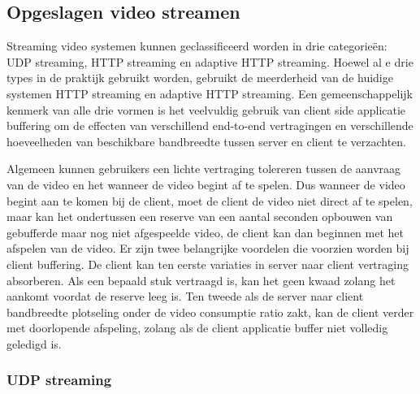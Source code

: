 \subsection{Opgeslagen video streamen}

\noindent Streaming video systemen kunnen geclassificeerd worden in drie categorieën: UDP streaming, HTTP streaming en adaptive HTTP streaming. Hoewel al e drie types in de praktijk gebruikt worden, gebruikt de meerderheid van de huidige systemen HTTP streaming en adaptive HTTP streaming.
Een gemeenschappelijk kenmerk van alle drie vormen is het veelvuldig gebruik van client side applicatie buffering om de effecten van verschillend end-to-end vertragingen en verschillende hoeveelheden van beschikbare bandbreedte tussen server en client te verzachten.

\noindent Algemeen kunnen gebruikers een lichte vertraging tolereren tussen de aanvraag van de video en het wanneer de video begint af te spelen. Dus wanneer de video begint aan te komen bij de client, moet de client de video niet direct af te spelen, maar kan het ondertussen een reserve van een aantal seconden opbouwen van gebufferde maar nog niet afgespeelde video, de client kan dan beginnen met het afspelen van de video. Er zijn twee belangrijke voordelen die voorzien worden bij client buffering. De client kan ten eerste variaties in server naar client vertraging absorberen. Als een bepaald stuk vertraagd is, kan het geen kwaad zolang het aankomt voordat de reserve leeg is. Ten tweede als de server naar client bandbreedte plotseling onder de video consumptie ratio zakt, kan de client verder met doorlopende afspeling, zolang als de client applicatie buffer niet volledig geledigd is.

\subsubsection{UDP streaming}

